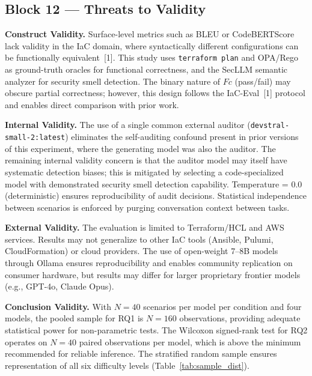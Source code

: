 \begin{figure}[htbp]

\end{figure}

\subsection{Block 12 --- Threats to Validity}
\label{sec:block12}

\textbf{Construct Validity.} Surface-level metrics such as BLEU or
CodeBERTScore lack validity in the IaC domain, where syntactically
different configurations can be functionally equivalent~[1]. This
study uses \texttt{terraform plan} and OPA/Rego as ground-truth
oracles for functional correctness, and the SecLLM semantic analyzer
for security smell detection. The binary nature of $Fc$ (pass/fail)
may obscure partial correctness; however, this design follows the
IaC-Eval~[1] protocol and enables direct comparison with prior work.

\textbf{Internal Validity.} The use of a single common external
auditor (\texttt{devstral-small-2:latest}) eliminates the
self-auditing confound present in prior versions of this experiment,
where the generating model was also the auditor. The remaining
internal validity concern is that the auditor model may itself have
systematic detection biases; this is mitigated by selecting a
code-specialized model with demonstrated security smell detection
capability. Temperature = 0.0 (deterministic) ensures reproducibility
of audit decisions. Statistical independence between scenarios is
enforced by purging conversation context between tasks.

\textbf{External Validity.} The evaluation is limited to
Terraform/HCL and AWS services. Results may not generalize to other
IaC tools (Ansible, Pulumi, CloudFormation) or cloud providers.
The use of open-weight 7--8B models through Ollama ensures
reproducibility and enables community replication on consumer
hardware, but results may differ for larger proprietary frontier
models (e.g., GPT-4o, Claude Opus).

\textbf{Conclusion Validity.} With $N = 40$ scenarios per model
per condition and four models, the pooled sample for RQ1 is
$N = 160$ observations, providing adequate statistical power for
non-parametric tests. The Wilcoxon signed-rank test for RQ2 operates
on $N = 40$ paired observations per model, which is above the
minimum recommended for reliable inference. The stratified random
sample ensures representation of all six difficulty levels
(Table~\ref{tab:sample_dist}).
